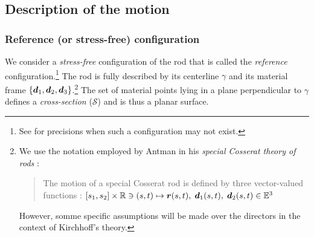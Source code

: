 \subsection{Description of the motion}
\subsubsection{Reference (or stress-free) configuration}

We consider a \emph{stress-free} configuration of the rod that is called the \emph{reference} configuration.\footnote{See \cite[p.~20]{Audoly2010} for precisions when such a configuration may not exist.} The rod is fully described by its centerline ${\gamma}$ and its material frame $\{{\boldsymbol{d}_1}, {\boldsymbol{d}_2}, {\boldsymbol{d}_3}\}$.\footnote{We use the notation employed by Antman in his \emph{special Cosserat theory of rods} : \blockcquote[p.~270]{Antman2005}{The motion of a special Cosserat rod is defined by three vector-valued functions : $ [s_1, s_2] \times \mathbb{R} \ni  (s,t) \mapsto \boldsymbol{r}(s,t), \; \boldsymbol{d}_1 (s,t), \; \boldsymbol{d}_2 (s,t) \in \mathbb{E}^3$}. However, somme specific assumptions will be made over the directors in the context of Kirchhoff's theory.} The set of material points lying in a plane perpendicular to ${\gamma}$ defines a \emph{cross-section} ($\mathcal{S}$) and is thus a planar surface. 

